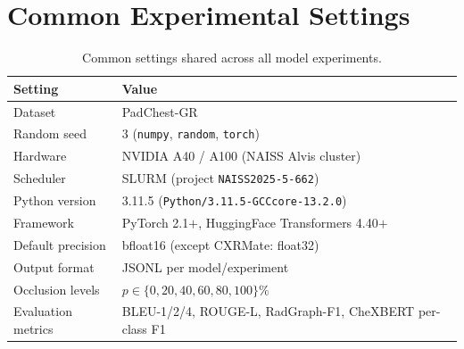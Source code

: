 \documentclass[10pt,a4paper]{article}
\begin{document}
\section{Common Experimental Settings}
\label{sec:common}

\begin{table}[ht]
\centering
\caption{Common settings shared across all model experiments.}
\label{tab:common}
\small
\begin{tabular}{L{4.5cm} L{9.0cm}}
\toprule
\textbf{Setting} & \textbf{Value} \\
\midrule
Dataset            & PadChest-GR \\
Random seed        & 3 (\texttt{numpy}, \texttt{random}, \texttt{torch}) \\
Hardware           & NVIDIA A40 / A100 (NAISS Alvis cluster) \\
Scheduler          & SLURM (project \texttt{NAISS2025-5-662}) \\
Python version     & 3.11.5 (\texttt{Python/3.11.5-GCCcore-13.2.0}) \\
Framework          & PyTorch 2.1$+$, HuggingFace Transformers 4.40$+$ \\
Default precision  & bfloat16 (except CXRMate: float32) \\
Output format      & JSONL per model/experiment \\
Occlusion levels   & $p \in \{0, 20, 40, 60, 80, 100\}\%$ \\
Evaluation metrics & BLEU-1/2/4, ROUGE-L, RadGraph-F1,
                     CheXBERT per-class F1 \\
\bottomrule
\end{tabular}
\end{table}
\end{document}
